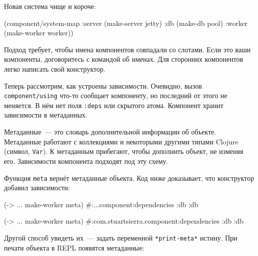 \fi

\noindent
Новая система чище и короче:

\begin{english}
  \begin{clojure}
(component/system-map
 :server (make-server jetty)
 :db     (make-db pool)
 :worker (make-worker worker))
  \end{clojure}
\end{english}

Подход требует, чтобы имена компонентов совпадали со слотами. Если это ваши
компоненты, договоритесь с командой об именах. Для сторонних компонентов легко
написать свой конструктор.


Теперь рассмотрим, как устроены зависимости. Очевидно, вызов
\verb|component/using| что-то сообщает компоненту, но последний от этого не
меняется. В нём нет поля \verb|:deps| или скрытого атома. Компонент хранит
зависимости в метаданных.

Метаданные~--- это словарь дополнительной информации об объекте. Метаданные
работают с коллекциями и некоторыми другими типами Clojure (символ,
\verb|Var|). К метаданным прибегают, чтобы дополнить объект, не изменяя
его. Зависимости компонента подходят под эту схему.

Функция \verb|meta| вернёт метаданные объекта. Код ниже доказывает, что
конструктор добавил зависимости:

\ifnarrow

\begin{english}
  \begin{clojure}
(-> {...} make-worker meta)
#:...component{:dependencies {:db :db}}
  \end{clojure}
\end{english}

\else

\begin{english}
  \begin{clojure}
(-> {...} make-worker meta)
#:com.stuartsierra.component{:dependencies {:db :db}}
  \end{clojure}
\end{english}

\fi

Другой способ увидеть их~--- задать переменной \verb|*print-meta*| истину. При
печати объекта в REPL появятся метаданные:



